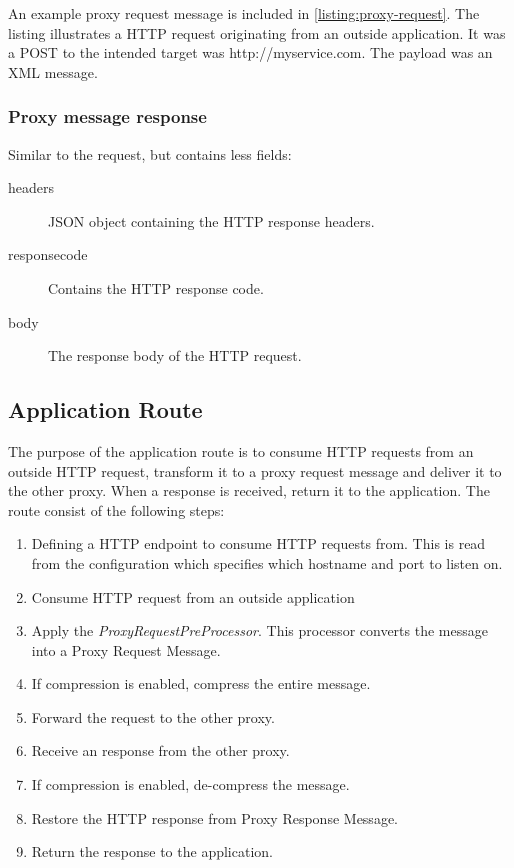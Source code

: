 An example proxy request message is included in \cref{listing:proxy-request}.
The listing illustrates a HTTP request originating from an outside application.
It was a POST to the intended target was http://myservice.com. The payload was
an XML message.



\paragraph{}


\subsubsection{Proxy message response}

Similar to the request, but contains less fields:

\begin{description}
	\item[headers] JSON object containing the HTTP response headers.
	\item[responsecode] Contains the HTTP response code.
	\item[body] The response body of the HTTP request.
\end{description}





\subsection{Application Route}

The purpose of the application route is to consume HTTP requests from an
outside HTTP request, transform it to a proxy request message and deliver it
to the other proxy. When a response is received, return it to the application.
The route consist of the following steps:

\begin{enumerate}
	\item Defining a HTTP endpoint to consume HTTP requests from. This is read from the configuration which specifies which hostname and port to listen on.
	\item Consume HTTP request from an outside application
	\item Apply the \textit{ProxyRequestPreProcessor}. This processor converts the message into a Proxy Request Message.
	\item If compression is enabled, compress the entire message.
	\item Forward the request to the other proxy.
	\item Receive an response from the other proxy.
	\item If compression is enabled, de-compress the message.
	\item Restore the HTTP response from Proxy Response Message.
	\item Return the response to the application.
\end{enumerate}

